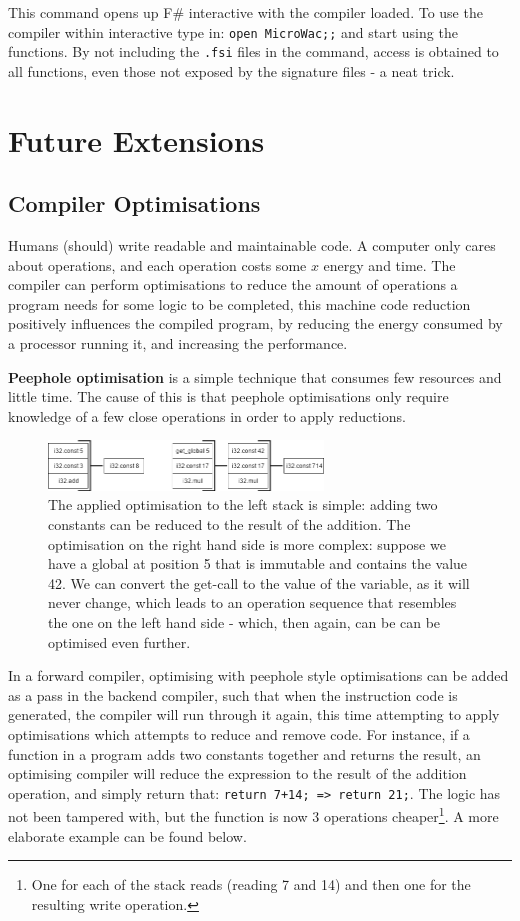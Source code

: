 \documentclass[a4paper]{article}
\begin{document}
This command opens up F\# interactive with the compiler loaded. To use the compiler within interactive type in: \texttt{open MicroWac;;} and start using the functions. By not including the \texttt{.fsi} files in the command, access is obtained to all functions, even those not exposed by the signature files - a neat trick.

\section{Future Extensions}
\label{sec:extensions}

\subsection{Compiler Optimisations}
\label{sec:extensions:optimisations}
Humans (should) write readable and maintainable code. A computer only cares about operations, and each operation costs some $x$ energy and time. The compiler can perform optimisations to reduce the amount of operations a program needs for some logic to be completed, this machine code reduction positively influences the compiled program, by reducing the energy consumed by a processor running it, and increasing the performance.

\textbf{Peephole optimisation} is a simple technique that consumes few resources and little time. The cause of this is that peephole optimisations only require knowledge of a few close operations in order to apply reductions.

\begin{figure}[H]
	\includegraphics[width=0.65\textwidth]{PeepholeOptimisationIllustrations}
	\centering
	\caption{The applied optimisation to the left stack is simple: adding two constants can be reduced to the result of the addition. The optimisation on the right hand side is more complex: suppose we have a global at position 5 that is immutable and contains the value 42. We can convert the get-call to the value of the variable, as it will never change, which leads to an operation sequence that resembles the one on the left hand side - which, then again, can be can be optimised even further.}
\end{figure}

In a forward compiler, optimising with peephole style optimisations can be added as a pass in the backend compiler, such that when the instruction code is generated, the compiler will run through it again, this time attempting to apply optimisations which attempts to reduce and remove code. For instance, if a function in a program adds two constants together and returns the result, an optimising compiler will reduce the expression to the result of the addition operation, and simply return that: \texttt{return 7+14; => return 21;}. The logic has not been tampered with, but the function is now 3 operations cheaper\footnote{One for each of the stack reads (reading 7 and 14) and then one for the resulting write operation.}. A more elaborate example can be found below.
\end{document}
